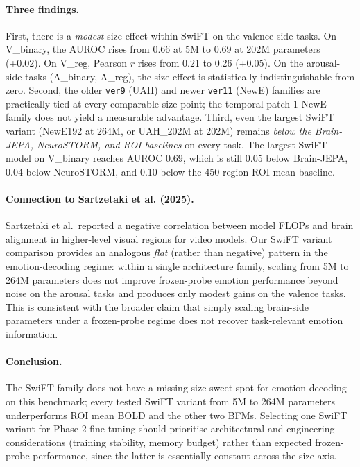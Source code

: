 \documentclass[11pt, a4paper]{article}
\begin{document}
\paragraph{Three findings.}
First, there is a \emph{modest} size effect within SwiFT on the valence-side tasks. On
V\_binary, the AUROC rises from \num{0.66} at 5M to \num{0.69} at 202M parameters
(+\num{0.02}). On V\_reg, Pearson $r$ rises from \num{0.21} to \num{0.26} (+\num{0.05}).
On the arousal-side tasks (A\_binary, A\_reg), the size effect is statistically
indistinguishable from zero. Second, the older \texttt{ver9} (UAH) and newer \texttt{ver11}
(NewE) families are practically tied at every comparable size point; the temporal-patch-1
NewE family does not yield a measurable advantage. Third, even the largest SwiFT variant
(NewE192 at 264M, or UAH\_202M at 202M) remains \emph{below the Brain-JEPA, NeuroSTORM, and
ROI baselines} on every task. The largest SwiFT model on V\_binary reaches AUROC
\num{0.69}, which is still \num{0.05} below Brain-JEPA, \num{0.04} below NeuroSTORM, and
\num{0.10} below the 450-region ROI mean baseline.

\paragraph{Connection to Sartzetaki et al. (2025).}
Sartzetaki et al.\ reported a negative correlation between model FLOPs and brain alignment
in higher-level visual regions for video models. Our SwiFT variant comparison provides an
analogous \emph{flat} (rather than negative) pattern in the emotion-decoding regime:
within a single architecture family, scaling from 5M to 264M parameters does not improve
frozen-probe emotion performance beyond noise on the arousal tasks and produces only modest
gains on the valence tasks. This is consistent with the broader claim that simply scaling
brain-side parameters under a frozen-probe regime does not recover task-relevant emotion
information.

\paragraph{Conclusion.}
The SwiFT family does not have a missing-size sweet spot for emotion decoding on this
benchmark; every tested SwiFT variant from 5M to 264M parameters underperforms ROI mean
BOLD and the other two BFMs. Selecting one SwiFT variant for Phase 2 fine-tuning should
prioritise architectural and engineering considerations (training stability, memory
budget) rather than expected frozen-probe performance, since the latter is essentially
constant across the size axis.
\end{document}
